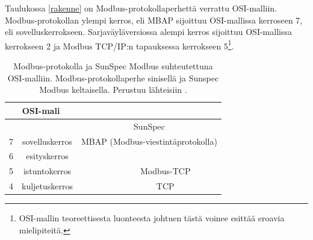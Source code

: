     Taulukossa \ref{rakenne} on Modbus-protokollaperhettä verrattu \gls{OSI}-malliin. Modbus-protokollan ylempi kerros, eli \gls{MBAP} sijoittuu \gls{OSI}-mallissa kerroseen 7, eli sovelluskerrokseen. Sarjaväyläversiossa alempi kerros sijoittuu \gls{OSI}-mallissa kerrokseen 2 ja Modbus TCP/IP:n tapauksessa kerrokseen 5\footnote{\gls{OSI}-mallin teoreettisesta luonteesta johtuen tästä voinee esittää eroavia mielipiteitä.}.
    \begin{table}
      \centering
      \caption[Modbus-protokollan rakenne, \gls{OSI}-malli ja SunSpec]{Modbus-protokolla ja  SunSpec Modbus suhteutettuna \gls{OSI}-malliin. Modbus-protokollaperhe sinisellä ja Sunspec Modbus keltaisella. Perustuu lähteisiin \parencite{osi, modbusSerialSpec, modbusTCPIPSpec, SSTech}.}
      \begin{tabular}{|c|c|ccc}
      \cline{1-2}
      \multicolumn{2}{|c|}{OSI-mali}                                               & \multicolumn{3}{c}{}                                                                                                                                                                \\ \hline
      \multicolumn{1}{|l|}{}                    &                                  & \multicolumn{3}{c|}{\cellcolor[HTML]{FFFFC7}SunSpec}                                                                                                                                \\ \cline{3-5}
      \multicolumn{1}{|l|}{\multirow{-2}{*}{7}} & \multirow{-2}{*}{sovelluskerros} & \multicolumn{3}{c|}{\cellcolor[HTML]{6F6FE6}\gls{MBAP} (Modbus-viestintäprotokolla)}                                                                                                      \\ \hline
      6                                         & esityskerros                     &                                                         &                                                           & \multicolumn{1}{c|}{}                                         \\ \cline{1-2} \cline{5-5}
      5                                         & istuntokerros                    &                                                         & \multicolumn{1}{c|}{}                                     & \multicolumn{1}{c|}{\cellcolor[HTML]{6F6FE6}Modbus-\gls{TCP}} \\ \cline{1-2} \cline{5-5}
      4                                         & kuljetuskerros                   &                                                         & \multicolumn{1}{c|}{}                                     & \multicolumn{1}{c|}{\gls{TCP}}                                \\ \cline{1-2} \cline{5-5}

\end{tabular}
\end{table}
